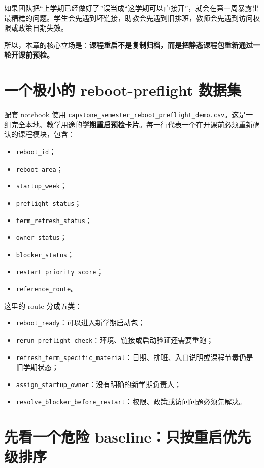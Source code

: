 如果团队把“上学期已经做好了”误当成“这学期可以直接开”，就会在第一周暴露出最糟糕的问题。学生会先遇到坏链接，助教会先遇到旧排班，教师会先遇到访问权限或政策日期失效。

所以，本章的核心立场是：\textbf{课程重启不是复制归档，而是把静态课程包重新通过一轮开课前预检。}

\section{一个极小的 reboot-preflight 数据集}

配套 notebook 使用 \nolinkurl{capstone_semester_reboot_preflight_demo.csv}。这是一组完全本地、教学用途的\textbf{学期重启预检卡片}。每一行代表一个在开课前必须重新确认的课程模块，包含：

\begin{itemize}
    \item \texttt{reboot\_id}；
    \item \texttt{reboot\_area}；
    \item \texttt{startup\_week}；
    \item \texttt{preflight\_status}；
    \item \texttt{term\_refresh\_status}；
    \item \texttt{owner\_status}；
    \item \texttt{blocker\_status}；
    \item \texttt{restart\_priority\_score}；
    \item \texttt{reference\_route}。
\end{itemize}

这里的 route 分成五类：

\begin{itemize}
    \item \texttt{reboot\_ready}：可以进入新学期启动包；
    \item \texttt{rerun\_preflight\_check}：环境、链接或启动验证还需要重跑；
    \item \texttt{refresh\_term\_specific\_material}：日期、排班、入口说明或课程节奏仍是旧学期状态；
    \item \texttt{assign\_startup\_owner}：没有明确的新学期负责人；
    \item \texttt{resolve\_blocker\_before\_restart}：权限、政策或访问问题必须先解决。
\end{itemize}

\section{先看一个危险 baseline：只按重启优先级排序}


